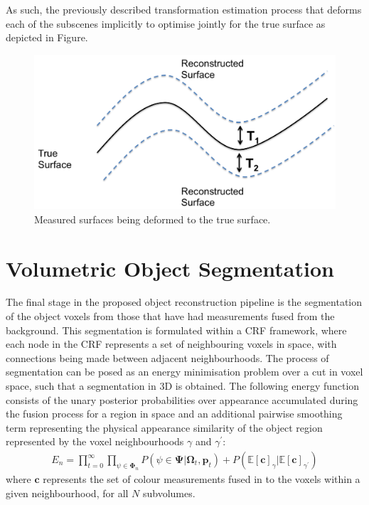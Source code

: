 As such, the previously described transformation estimation process that deforms each of the subscenes implicitly to optimise jointly for the true 
surface as depicted in Figure.
\begin{figure}[!t]
	\centering
	\includegraphics[scale=0.25]{deformation.png}
	\caption{Measured surfaces being deformed to the true surface.}
	\label{deformationDiagram}
\end{figure}


\section{Volumetric Object Segmentation}
The final stage in the proposed object reconstruction pipeline is the segmentation of the object voxels from those that have had measurements fused 
from the background. This segmentation is formulated within a CRF framework, where each node in the CRF represents a set of neighbouring voxels in space, 
with connections being made between adjacent neighbourhoods. The process of segmentation can be posed as an energy minimisation problem over a cut in voxel space, 
such that a segmentation in 3D is obtained. The following energy function consists of the unary posterior probabilities over appearance accumulated during the fusion 
process for a region in space and an additional pairwise smoothing term representing the physical appearance similarity of the object region represented by the voxel 
neighbourhoods $\gamma$ and $\gamma^{'}$:
\begin{equation}
\begin{split}
E_{n} = \prod_{t=0}^{\infty} \prod_{\psi \in \bm{\Phi}_{n}} P(\psi \in \bm{\Psi} | \bm{\Omega}_{t}, \bm{p}_{t}) + P(\mathbb{E}[\bm{c}]_{\gamma} | \mathbb{E}[\bm{c}]_{\gamma^{'}})
\end{split}
\end{equation}
where $\bm{c}$ represents the set of colour measurements fused in to the voxels within a given neighbourhood, for all $N$ subvolumes.

